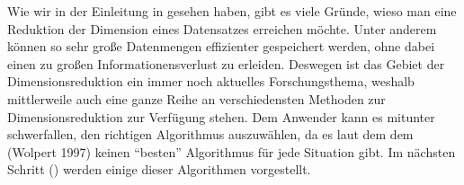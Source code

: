 Wie wir in der Einleitung in  gesehen haben, gibt es viele Gründe, wieso man eine Reduktion der Dimension eines Datensatzes erreichen möchte. Unter anderem können so sehr große Datenmengen effizienter gespeichert werden, ohne dabei einen zu großen Informationensverlust zu erleiden. Deswegen ist das Gebiet der Dimensionsreduktion ein immer noch aktuelles Forschungsthema, weshalb mittlerweile auch eine ganze Reihe an verschiedensten Methoden zur Dimensionsreduktion zur Verfügung stehen. Dem Anwender kann es mitunter schwerfallen, den richtigen Algorithmus auszuwählen, da es laut dem dem \addref (Wolpert 1997) keinen \enquote{besten} Algorithmus für jede Situation gibt. Im nächsten Schritt () werden einige dieser Algorithmen vorgestellt.

